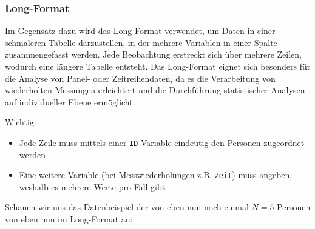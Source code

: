 \documentclass[
]{book}
\providecommand{\tightlist}{%
  \setlength{\itemsep}{0pt}\setlength{\parskip}{0pt}}
\begin{document}
\hypertarget{long-format}{%
\subsubsection{Long-Format}\label{long-format}}

Im Gegensatz dazu wird das Long-Format verwendet, um Daten in einer schmaleren Tabelle darzustellen, in der mehrere Variablen in einer Spalte zusammengefasst werden. Jede Beobachtung erstreckt sich über mehrere Zeilen, wodurch eine längere Tabelle entsteht. Das Long-Format eignet sich besonders für die Analyse von Panel- oder Zeitreihendaten, da es die Verarbeitung von wiederholten Messungen erleichtert und die Durchführung statistischer Analysen auf individueller Ebene ermöglicht.

Wichtig:

\begin{itemize}
\tightlist
\item
  Jede Zeile muss mittels einer \texttt{ID} Variable eindeutig den Personen zugeordnet werden
\item
  Eine weitere Variable (bei Messwiederholungen z.B. \texttt{Zeit}) muss angeben, weshalb es mehrere Werte pro Fall gibt
\end{itemize}

Schauen wir uns das Datenbeispiel der von eben nun noch einmal \(N=5\) Personen von eben nun im Long-Format an:
\end{document}
